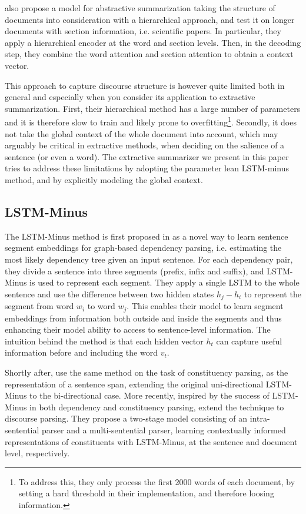  also propose a model for abstractive summarization taking the structure of documents into consideration with a hierarchical approach, and test it on longer documents with section information, i.e. scientific papers. In particular, they apply a hierarchical encoder at the word and section levels. Then, in the decoding step, they combine the word attention and section attention to obtain a context vector. 

This approach to capture discourse structure is however quite limited both in general and especially when you consider its application to extractive summarization. First, their hierarchical method has a large number of parameters and it is therefore  slow to train and likely prone to overfitting\footnote{To address this, they only process the first 2000 words of each document, by setting a hard threshold in their implementation, and therefore loosing information.}. Secondly, it  does not take the global context of the whole document into account, which may arguably be critical in extractive methods, when deciding on the salience of a sentence (or even a word). The extractive summarizer we present in this paper tries to address these limitations by adopting the  parameter lean LSTM-minus method, and by explicitly modeling the global context.
\subsection{LSTM-Minus}
The LSTM-Minus method is first proposed in \cite{lstm-minus_propose} as a novel way to learn sentence segment embeddings for graph-based dependency parsing, i.e. estimating the most likely dependency tree given an input sentence. For each dependency pair, they divide a sentence into three segments (prefix, infix and suffix), and LSTM-Minus is used to represent each segment. They apply a single LSTM to the whole sentence and  use the difference between two hidden states $h_j-h_i$ to represent the segment from word  $w_i$  to word $w_j$. This enables  their model to learn segment embeddings from information both outside and inside the segments and thus enhancing their model ability to access to sentence-level information. The intuition behind the method is that each hidden vector $h_t$ can capture useful information before and including the word $v_t$. 

Shortly after,  use the same method on the task of constituency parsing, as the representation of a sentence span, extending the original uni-directional LSTM-Minus to the bi-directional case. 
More recently, inspired by the success of LSTM-Minus in both dependency and constituency parsing,  extend the technique to discourse parsing. They propose a two-stage model consisting of an intra-sentential parser and a multi-sentential parser, learning contextually informed representations of
constituents with LSTM-Minus, at the sentence and document level, respectively. 

